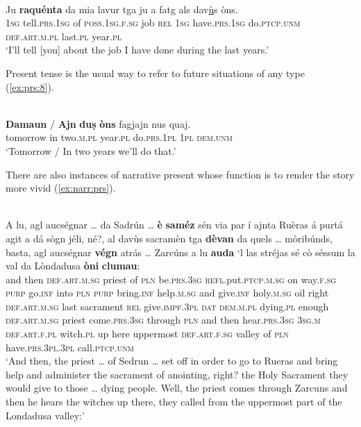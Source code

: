 \ea\label{ex:prs:7}
\\
\gll   Ju \textbf{raquénta} da mia lavur tga ju a fatg als dav\underline{ù}s òns. \\
\textsc{1sg} tell.\textsc{prs.1sg} of \textsc{poss.1sg.f.sg} job \textsc{rel} \textsc{1sg}  have.\textsc{prs.1sg} do.\textsc{ptcp.unm} \textsc{def.art.m.pl} last.\textsc{pl} year.\textsc{pl}\\
\glt `I’ll tell [you] about the job I have done during the last years.'
\z

Present tense is the usual way to refer to future situations of any type (\ref{ex:prs:8}).

\ea\label{ex:prs:8}
\\
\gll   \textbf{Damaun} / \textbf{Ajn} \textbf{duṣ} \textbf{òns} fagjajn nus quaj. \\
tomorrow {} in two.\textsc{m.pl} year.\textsc{pl} do.\textsc{prs.1pl} \textsc{1pl} \textsc{dem.unm}\\
\glt `Tomorrow / In two years we'll do that.'
\z

There are also instances of narrative present whose function is to render the story more vivid (\ref{ex:narr:prs}).

\ea\label{ex:narr:prs}
\\
\gll    A lu, agl aucségnar … da Sadrún … \textbf{è} \textbf{saméz} sén via par í ajnta Ruèras á purtá agit a dá sògn jéli, né?, al davùs sacramèn tga \textbf{dèvan} da quels … mòribúnds, basta, agl aucségnar \textbf{végn} atrás … Zarcúns a lu \textbf{auda} `l las stréjas sé cò séssum la val da Lòndadusa \textbf{òni} \textbf{clumau}:\\
and then \textsc{def.art.m.sg} priest {} of \textsc{pln} {} be.\textsc{prs.3sg}  \textsc{refl.}put.\textsc{ptcp.m.sg} on way.\textsc{f.sg} \textsc{purp} go.\textsc{inf} into \textsc{pln}  \textsc{purp} bring.\textsc{inf} help.\textsc{m.sg} and give.\textsc{inf} holy.\textsc{m.sg} oil right \textsc{def.art.m.sg} last sacrament \textsc{rel} give.\textsc{impf.3pl} \textsc{dat} \textsc{dem.m.pl} {} dying.\textsc{pl} enough \textsc{def.art.m.sg} priest come.\textsc{prs.3sg} through {} \textsc{pln} and then hear.\textsc{prs.3sg} \textsc{3sg.m} \textsc{def.art.f.pl} witch.\textsc{pl} up here uppermost \textsc{def.art.f.sg} valley of \textsc{pln} have.\textsc{prs.3pl.3pl} call.\textsc{ptcp.unm}\\
\glt `And then, the priest … of Sedrun … set off in order to go to Rueras and bring help and administer the sacrament of anointing, right? the Holy Sacrament they would give to those … dying people. Well, the priest comes through Zarcuns and then he hears the witches up there, they called from the uppermost part of the Londadusa valley:'
\z

